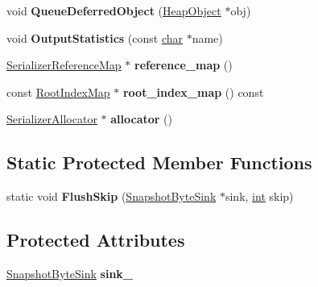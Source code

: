 \begin{DoxyCompactItemize}
void {\bfseries Queue\+Deferred\+Object} (\mbox{\hyperlink{classv8_1_1internal_1_1HeapObject}{Heap\+Object}} $\ast$obj)
\item 
\mbox{\label{classv8_1_1internal_1_1Serializer_aa71724460718545dc17a6ce88b2c4300}} 
void {\bfseries Output\+Statistics} (const \mbox{\hyperlink{classchar}{char}} $\ast$name)
\item 
\mbox{\label{classv8_1_1internal_1_1Serializer_aa5fc7dd5cdc84a3ff41bcc9287cb09d0}} 
\mbox{\hyperlink{classv8_1_1internal_1_1SerializerReferenceMap}{Serializer\+Reference\+Map}} $\ast$ {\bfseries reference\+\_\+map} ()
\item 
\mbox{\label{classv8_1_1internal_1_1Serializer_acff7806fce4b2795cc3a4fe40fe16665}} 
const \mbox{\hyperlink{classv8_1_1internal_1_1RootIndexMap}{Root\+Index\+Map}} $\ast$ {\bfseries root\+\_\+index\+\_\+map} () const
\item 
\mbox{\label{classv8_1_1internal_1_1Serializer_a884d2eb464f0e40297ff32557ac36a69}} 
\mbox{\hyperlink{classv8_1_1internal_1_1SerializerAllocator}{Serializer\+Allocator}} $\ast$ {\bfseries allocator} ()
\end{DoxyCompactItemize}
\subsection*{Static Protected Member Functions}
\begin{DoxyCompactItemize}
\item 
\mbox{\label{classv8_1_1internal_1_1Serializer_a322d102b0677bdcf00688f1ac431dfc0}} 
static void {\bfseries Flush\+Skip} (\mbox{\hyperlink{classv8_1_1internal_1_1SnapshotByteSink}{Snapshot\+Byte\+Sink}} $\ast$sink, \mbox{\hyperlink{classint}{int}} skip)
\end{DoxyCompactItemize}
\subsection*{Protected Attributes}
\begin{DoxyCompactItemize}
\item 
\mbox{\label{classv8_1_1internal_1_1Serializer_a6c1513b0ef81406f8b5ae65f22492480}} 
\mbox{\hyperlink{classv8_1_1internal_1_1SnapshotByteSink}{Snapshot\+Byte\+Sink}} {\bfseries sink\+\_\+}
\end{DoxyCompactItemize}
